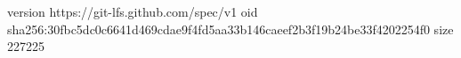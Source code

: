 version https://git-lfs.github.com/spec/v1
oid sha256:30fbc5dc0c6641d469cdae9f4fd5aa33b146caeef2b3f19b24be33f4202254f0
size 227225
